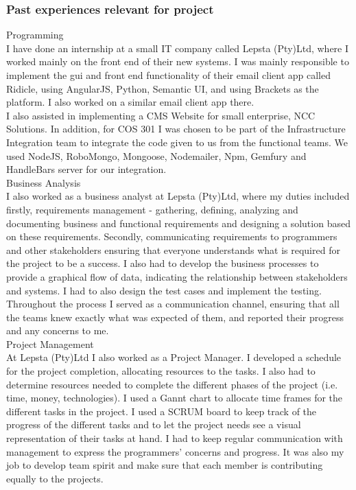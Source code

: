\documentclass[hidelinks, 12pt, oneside]{article}
\begin{document}
\subsubsection{Past experiences relevant for project}
Programming \\
I have done an internship at a small IT company called Lepsta (Pty)Ltd, where I worked mainly on the front end of their new systems. I was mainly responsible to implement the gui and front end functionality of their email client app called Ridicle, using AngularJS, Python, Semantic UI, and using Brackets as the platform.
I also worked on a similar email client app there.\\
I also assisted in implementing a CMS Website for small enterprise, NCC Solutions. In addition, for COS 301 I was chosen to be part of the Infrastructure Integration team to integrate the code given to us from the functional teams. We used NodeJS, RoboMongo, Mongoose, Nodemailer, Npm, Gemfury and HandleBars server for our integration. \\

Business Analysis \\
I also worked as a business analyst at Lepsta (Pty)Ltd, where my duties included firstly, requirements management - gathering, defining, analyzing and documenting business and functional requirements and designing a solution based on these requirements. Secondly, communicating requirements to programmers and other stakeholders ensuring that everyone understands what is required for the project to be a success. I also had to develop the business processes to provide a graphical flow of data, indicating the relationship between stakeholders and systems. I had to also design the test cases and implement the testing. Throughout the process I served as a communication channel, ensuring that all the teams knew exactly what was expected of them, and reported their progress and any concerns to me.
\\
Project Management \\
At Lepsta (Pty)Ltd I also worked as a Project Manager. I developed a schedule for the project completion, allocating resources to the tasks. I also had to determine resources needed to complete the different phases of the project (i.e. time, money, technologies). I used a Gannt chart to allocate time frames for the different tasks in the project. I used a SCRUM board to keep track of the progress of the different tasks and to let the project needs see a visual representation of their tasks at hand. I had to keep regular communication with management to express the programmers' concerns and progress. It was also my job to develop team spirit and make sure that each member is contributing equally to the projects. \\
 
\end{document}
